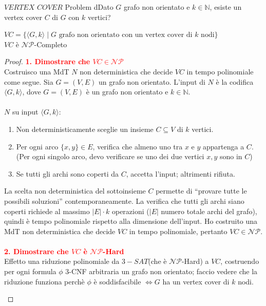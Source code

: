 \documentclass{article}  %
\theoremstyle{definition}
\begin{document}
\begin{theorem}{$VERTEX$ $COVER$ Problem}
	dDato $G$ grafo non orientato e $k \in \mathbb{N}$, esiste un vertex cover $C$ di $G$ con $k$ vertici?
	\begin{center}
		$VC = \{\langle G,k \rangle \mid G \text{ grafo non orientato con un vertex cover di } k \text{ nodi}\}$ \\
		$VC$ è $\mathcal{NP}$-Completo
	\end{center}
	\footnotesize
	\begin{proof}
		\textcolor{red}{\textbf{1. Dimostrare che $VC \in \mathcal{NP}$}} \\
		Costruisco una MdT $N$ non deterministica che decide $VC$ in tempo polinomiale come segue. Sia $G=(V,E)$ un grafo non orientato.
		L'input di \( N \) è la codifica \( \langle G, k \rangle \), dove \( G = (V, E) \) è un grafo non orientato e \( k \in \mathbb{N} \). \\ \\
		$N$ su input $\langle G, k \rangle$:
		\begin{enumerate}
			\item Non deterministicamente sceglie un insieme $C \subseteq V$ di $k$ vertici.
			\item Per ogni arco $\{x,y\} \in E$, verifica che almeno uno tra $x$ e $y$ appartenga a $C$. \\
			      (Per ogni singolo arco, devo verificare se uno dei due vertici $x,y$ sono in $C$)
			\item Se tutti gli archi sono coperti da $C$, accetta l'input; altrimenti rifiuta.
		\end{enumerate}
		La scelta non deterministica del sottoinsieme $C$ permette di “provare tutte le possibili soluzioni” contemporaneamente.
		La verifica che tutti gli archi siano coperti richiede al massimo $|E| \cdot k$ operazioni ($|E|$ numero totale archi del grafo), quindi è tempo polinomiale rispetto alla dimensione dell'input.
		Ho costruito una MdT non deterministica che decide $VC$ in tempo polinomiale, pertanto $VC \in \mathcal{NP}$. \\ \\
		\textcolor{red}{\textbf{2. Dimostrare che $VC$ è $\mathcal{NP}$-Hard}} \\
		Effetto una riduzione polinomiale da $3-SAT$(che è $\mathcal{NP}$-Hard) a $VC$, costruendo per ogni formula $\phi$ 3-CNF arbitraria un grafo non orientato; faccio
		vedere che la riduzione funziona perchè $\phi$ è soddisfacibile $\iff G$ ha un vertex cover di $k$ nodi.
		\begin{center}

\end{center}
\end{proof}
\end{theorem}
\end{document}
